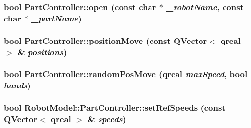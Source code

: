 \label{class_robot_model_1_1_part_controller_a02d325bdc7bd18023e47f97894a2de49}
\hypertarget{class_robot_model_1_1_part_controller_a20331379a94c33ef330792e6b9e8b94f}{
\subsubsection[{open}]{\setlength{\rightskip}{0pt plus 5cm}bool PartController::open (const char $\ast$ {\em \_\-robotName}, \/  const char $\ast$ {\em \_\-partName})}}
\label{class_robot_model_1_1_part_controller_a20331379a94c33ef330792e6b9e8b94f}
\hypertarget{class_robot_model_1_1_part_controller_aeb2bca8add9b083ebd19d0d2d07fdfd4}{
\subsubsection[{positionMove}]{\setlength{\rightskip}{0pt plus 5cm}bool PartController::positionMove (const QVector$<$ qreal $>$ \& {\em positions})}}
\label{class_robot_model_1_1_part_controller_aeb2bca8add9b083ebd19d0d2d07fdfd4}
\hypertarget{class_robot_model_1_1_part_controller_af513e2aa6934bcfeef7d2bf73e9b3cc3}{
\subsubsection[{randomPosMove}]{\setlength{\rightskip}{0pt plus 5cm}bool PartController::randomPosMove (qreal {\em maxSpeed}, \/  bool {\em hands})}}
\label{class_robot_model_1_1_part_controller_af513e2aa6934bcfeef7d2bf73e9b3cc3}
\hypertarget{class_robot_model_1_1_part_controller_a5481c9f2cbbd8370fd2e5b62c38c7d2f}{
\subsubsection[{setRefSpeeds}]{\setlength{\rightskip}{0pt plus 5cm}bool RobotModel::PartController::setRefSpeeds (const QVector$<$ qreal $>$ \& {\em speeds})}}
